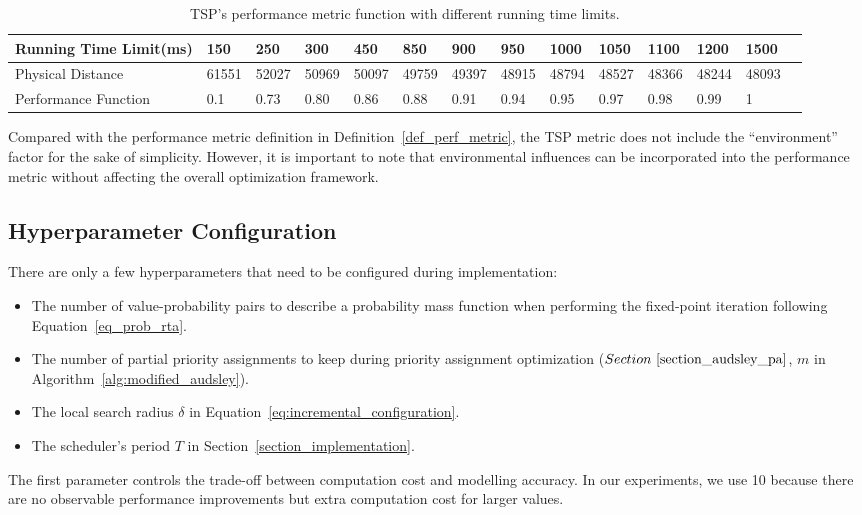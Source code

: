 \begin{table}[]
    \centering
    \caption{TSP's performance metric function with different running time limits.}
    \begin{tabular}{@{}llllllllllllll@{}}
        \toprule
        Running Time Limit(ms)       & 150   & 250   & 300   & 450   & 850   & 900   & 950   & 1000  & 1050  & 1100  & 1200  & 1500   \\ \midrule
        Physical Distance  & 61551 & 52027 & 50969 & 50097 & 49759 & 49397 & 48915 & 48794 & 48527 & 48366 & 48244 & 48093 \\
        Performance Function & 0.1   & 0.73  & 0.80 & 0.86  & 0.88  & 0.91  & 0.94  & 0.95  & 0.97  & 0.98  & 0.99  & 1        \\ \bottomrule
    \end{tabular}
    \label{table_tsp_perf}
\end{table}

Compared with the performance metric definition in Definition~\ref{def_perf_metric}, the TSP metric does not include the ``environment'' factor for the sake of simplicity.
However, it is important to note that environmental influences can be incorporated into the performance metric without affecting the overall optimization framework.


\subsection{Hyperparameter Configuration}

There are only a few hyperparameters that need to be configured during implementation:
\begin{itemize}
    \item The number of value-probability pairs to describe a probability mass function when performing the fixed-point iteration following Equation~\eqref{eq_prob_rta}.
    \item The number of partial priority assignments to keep during priority assignment optimization ($Section~\ref{section_audsley_pa}$, $m$ in Algorithm~\ref{alg:modified_audsley}).
    \item The local search radius $\delta$ in Equation~\eqref{eq:incremental_configuration}.
    \item The scheduler's period $T$ in Section~\ref{section_implementation}.
\end{itemize}
The first parameter controls the trade-off between computation cost and modelling accuracy.
In our experiments, we use 10 because there are no observable performance improvements but extra computation cost for larger values.


